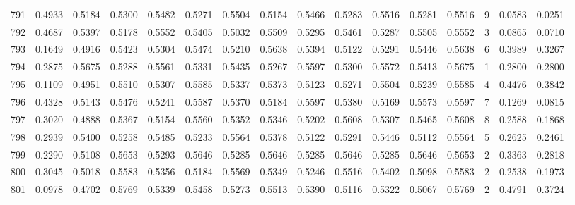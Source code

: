 \begin{tabular}{lrrrrrrrrrrrrrrr}
791 &      0.4933 &  0.5184 &  0.5300 &  0.5482 &  0.5271 &  0.5504 &  0.5154 &  0.5466 &  0.5283 &  0.5516 &   0.5281 &     0.5516 &      9 &                    0.0583 &                     0.0251 \\
792 &      0.4687 &  0.5397 &  0.5178 &  0.5552 &  0.5405 &  0.5032 &  0.5509 &  0.5295 &  0.5461 &  0.5287 &   0.5505 &     0.5552 &      3 &                    0.0865 &                     0.0710 \\
793 &      0.1649 &  0.4916 &  0.5423 &  0.5304 &  0.5474 &  0.5210 &  0.5638 &  0.5394 &  0.5122 &  0.5291 &   0.5446 &     0.5638 &      6 &                    0.3989 &                     0.3267 \\
794 &      0.2875 &  0.5675 &  0.5288 &  0.5561 &  0.5331 &  0.5435 &  0.5267 &  0.5597 &  0.5300 &  0.5572 &   0.5413 &     0.5675 &      1 &                    0.2800 &                     0.2800 \\
795 &      0.1109 &  0.4951 &  0.5510 &  0.5307 &  0.5585 &  0.5337 &  0.5373 &  0.5123 &  0.5271 &  0.5504 &   0.5239 &     0.5585 &      4 &                    0.4476 &                     0.3842 \\
796 &      0.4328 &  0.5143 &  0.5476 &  0.5241 &  0.5587 &  0.5370 &  0.5184 &  0.5597 &  0.5380 &  0.5169 &   0.5573 &     0.5597 &      7 &                    0.1269 &                     0.0815 \\
797 &      0.3020 &  0.4888 &  0.5367 &  0.5154 &  0.5560 &  0.5352 &  0.5346 &  0.5202 &  0.5608 &  0.5307 &   0.5465 &     0.5608 &      8 &                    0.2588 &                     0.1868 \\
798 &      0.2939 &  0.5400 &  0.5258 &  0.5485 &  0.5233 &  0.5564 &  0.5378 &  0.5122 &  0.5291 &  0.5446 &   0.5112 &     0.5564 &      5 &                    0.2625 &                     0.2461 \\
799 &      0.2290 &  0.5108 &  0.5653 &  0.5293 &  0.5646 &  0.5285 &  0.5646 &  0.5285 &  0.5646 &  0.5285 &   0.5646 &     0.5653 &      2 &                    0.3363 &                     0.2818 \\
800 &      0.3045 &  0.5018 &  0.5583 &  0.5356 &  0.5184 &  0.5569 &  0.5349 &  0.5246 &  0.5516 &  0.5402 &   0.5098 &     0.5583 &      2 &                    0.2538 &                     0.1973 \\
801 &      0.0978 &  0.4702 &  0.5769 &  0.5339 &  0.5458 &  0.5273 &  0.5513 &  0.5390 &  0.5116 &  0.5322 &   0.5067 &     0.5769 &      2 &                    0.4791 &                     0.3724 \\

\end{tabular}
